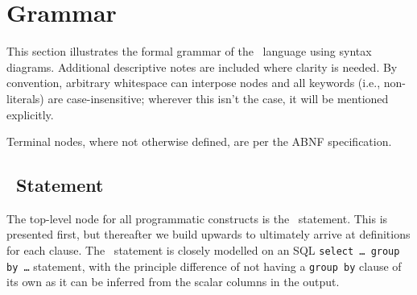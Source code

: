 % 
% 
% 
% 
% 

\section{Grammar}

This section illustrates the formal grammar of the \stag\ language using
syntax diagrams. Additional descriptive notes are included where clarity
is needed. By convention, arbitrary whitespace can interpose nodes and
all keywords (i.e., non-literals) are case-insensitive; wherever this
isn't the case, it will be mentioned explicitly.

Terminal nodes, where not otherwise defined, are per the ABNF
specification\cite{RFC5234}.

\subsection{\stag\ Statement}

The top-level node for all programmatic constructs is the \stag\
statement. This is presented first, but thereafter we build upwards to
ultimately arrive at definitions for each clause. The \stag\ statement
is closely modelled on an SQL \texttt{select \ldots\ group by \ldots}
statement, with the principle difference of not having a \texttt{group
by} clause of its own as it can be inferred from the scalar columns in
the output.

